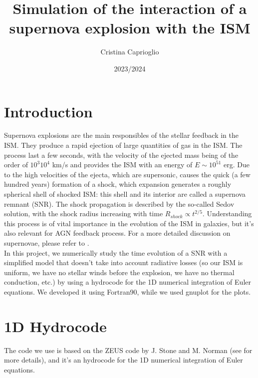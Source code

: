 \documentclass{article}
\title{Simulation of the interaction of a supernova explosion with the ISM}
\author{Cristina Caprioglio}
\date{2023/2024 }
\begin{document}
\maketitle

\section*{Introduction}\label{intro}
Supernova explosions are the main responsibles of the stellar feedback in the ISM. They produce a rapid ejection of large quantities of gas in the ISM. The process last a few seconds, with the velocity of the ejected mass being of the order of $10^{3}$\textemdash$10^{4}$ km/s and provides the ISM with an energy of $E\sim 10^{51}$ erg. Due to the high velocities of the ejecta, which are supersonic, causes the quick (a few hundred years) formation of a shock, which expansion generates a roughly spherical shell of shocked ISM: this shell and its interior are called a supernova remnant (SNR). 
The shock propagation is described by the so-called Sedov solution, with the shock radius increasing with time $R_{shock}\propto t^{2/5}$. Understanding this process is of vital importance in the evolution of the ISM in galaxies, but it's also relevant for AGN feedback process. 
For a more detailed discussion on supernovae, please refer to \cite[Sec. 8.7]{cimatti}.\\
In this project, we numerically study the time evolution of a SNR with a simplified model that doesn't take into account radiative losses (so our ISM is uniform,  we have no stellar winds before the explosion, we have no thermal conduction, etc.) by using a hydrocode for the 1D numerical integration of Euler equations. We developed it using Fortran90, while we used gnuplot for the plots.
\section{1D Hydrocode}
The code we use is based on the ZEUS code by J. Stone and M. Norman (see \cite{stone} for more details), and it's an hydrocode for the 1D numerical integration of Euler equations.
\end{document}
